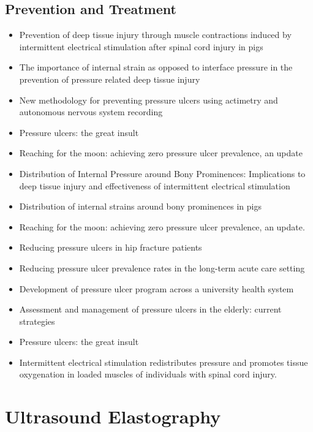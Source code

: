		\subsection{Prevention and Treatment}
			\begin{itemize}
				\item Prevention of deep tissue injury through muscle contractions induced by intermittent electrical stimulation after spinal cord injury in pigs \cite{solis13}
				\item The importance of internal strain as opposed to interface pressure in the prevention of pressure related deep tissue injury \cite{oomens10}
				\item New methodology for preventing pressure ulcers using actimetry and autonomous nervous system recording \cite{meffre06}
				\item Pressure ulcers: the great insult \cite{maklebust05}
				\item Reaching for the moon: achieving zero pressure ulcer prevalence, an update \cite{bales11}
				\item Distribution of Internal Pressure around Bony Prominences: Implications to deep tissue injury and effectiveness of intermittent electrical stimulation \cite{solis12-02}
				\item Distribution of internal strains around bony prominences in pigs \cite{solis12-03}
				\item Reaching for the moon: achieving zero pressure ulcer prevalence, an update. \cite{bales11}
				\item Reducing pressure ulcers in hip fracture patients \cite{thompson11}
				\item Reducing pressure ulcer prevalence rates in the long-term acute care setting \cite{milne09}
				\item Development of pressure ulcer program across a university health system \cite{carson11}
				\item Assessment and management of pressure ulcers in the elderly: current strategies \cite{jaul10}
				\item Pressure ulcers: the great insult \cite{maklebust05}
				\item Intermittent electrical stimulation redistributes pressure and promotes tissue oxygenation in loaded muscles of individuals with spinal cord injury. \cite{gyawali11}
			\end{itemize}

	\section{Ultrasound Elastography}
		\lipsum[1]

